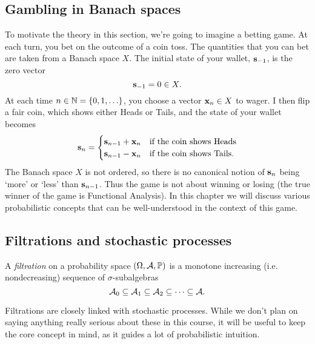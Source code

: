 

\subsection{Gambling in Banach spaces}\label{sec:gambling}

To motivate the theory in this section, we're going to imagine a betting game.
At each turn, you bet on the outcome of a coin toss.
The quantities that you can bet are taken from a Banach space $X$.
The initial state of your wallet, $\mathbf{s}_{-1}$, is the zero vector
\begin{equation*}
  \mathbf{s}_{-1} = 0 \in X.
\end{equation*}
At each time $n \in \mathbb{N} = \{0,1,\ldots\}$, you choose a vector $\mathbf{x}_n \in X$ to wager.
I then flip a fair coin, which shows either Heads or Tails, and the state of your wallet becomes
\begin{equation*}
  \mathbf{s}_n =
  \begin{cases}
    \mathbf{s}_{n-1} + \mathbf{x}_n & \text{if the coin shows Heads} \\
    \mathbf{s}_{n-1} - \mathbf{x}_n & \text{if the coin shows Tails.}
  \end{cases}
\end{equation*}
The Banach space $X$ is not ordered, so there is no canonical notion of $\mathbf{s}_n$ being `more' or `less' than $\mathbf{s}_{n-1}$. Thus the game is not about winning or losing (the true winner of the game is Functional Analysis).
In this chapter we will discuss various probabilistic concepts that can be well-understood in the context of this game.


\subsection{Filtrations and stochastic processes}

\begin{defn}
  A \emph{filtration} on a probability space $(\Omega,\mathcal{A},\mathbb{P})$ is a monotone increasing (i.e. nondecreasing) sequence of $\sigma$-subalgebras
  \begin{equation*}
    \mathcal{A}_0 \subseteq \mathcal{A}_1 \subseteq \mathcal{A}_2 \subseteq \cdots \subseteq \mathcal{A}.
  \end{equation*}
\end{defn}

Filtrations are closely linked with stochastic processes.
While we don't plan on saying anything really serious about these in this course, it will be useful to keep the core concept in mind, as it guides a lot of probabilistic intuition.

